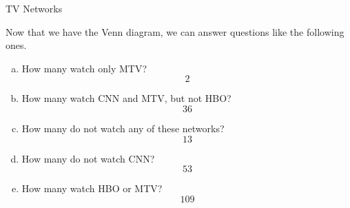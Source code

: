 \begin{example}{TV Networks}
\begin{center}
\begin{tikzpicture}
  
  
  
  
  
  
  
\end{tikzpicture}
\end{center}

Now that we have the Venn diagram, we can answer questions like the following ones.

\begin{enumerate}[(a)]
\item How many watch only MTV?
\[\boxed{2}\]
\item How many watch CNN and MTV, but not HBO?
\[\boxed{36}\]
\item How many do not watch any of these networks?
\[\boxed{13}\]
\item How many do not watch CNN?
\[\boxed{53}\]
\item How many watch HBO or MTV?
\[\boxed{109}\]
\end{enumerate}

\end{example}

